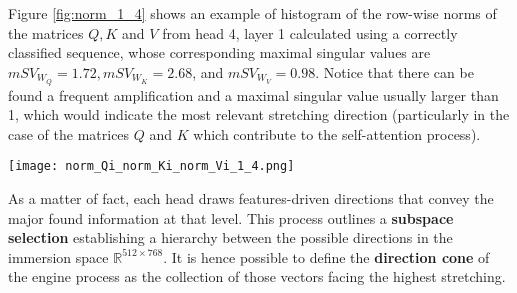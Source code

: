 \documentclass[11pt,a4paper,reqno]{amsart} %
\theoremstyle{definition}
\numberwithin{equation}{section}          %
\begin{document}
Figure \ref{fig:norm_1_4} shows an example of histogram of the row-wise norms of the matrices $Q, K$ and $V$ from head 4, layer 1 calculated using a correctly classified sequence,  whose corresponding maximal singular values are $mSV_{W_Q}=1.72, mSV_{W_K}=2.68$, and $mSV_{W_V}=0.98$. Notice that there can be found a frequent amplification and a maximal singular value usually larger than 1, which would indicate the most relevant stretching direction (particularly in the case of the matrices $Q$ and $K$ which contribute to the self-attention process). 

\begin{figure*}[h!]
    \centering
    {\texttt{[image: norm\_Qi\_norm\_Ki\_norm\_Vi\_1\_4.png]}}
    \caption{Histograms of the norms of the row-vectors $Q_i, K_i$ and $V_i$ of the matrices $Q,K$ and $V$, respectively, of a correctly classified sequence in head 4, layer 1.}
    \label{fig:norm_1_4}
\end{figure*}

As a matter of fact, each head draws features-driven directions that convey the major found information at that level. This process outlines a \textbf{subspace selection} establishing a hierarchy between the possible directions in the immersion space $\mathbb R^{512 \times 768}$. It is hence possible to define the \textbf{direction cone} of the engine process as the collection of those vectors facing the highest stretching.
\end{document}
